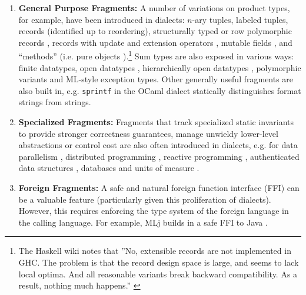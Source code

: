 \documentclass{llncs}
\begin{document}
\begin{enumerate}
\compresslist
\vspace{5px}
\item 
\textbf{General Purpose Fragments:} 
A number of variations on product types, for example, have been introduced in dialects: 
$n$-ary tuples, 
labeled tuples, 
records (identified up to reordering), 
structurally typed or row polymorphic records \cite{Cardelli:1984:SMI:1096.1098}, 
records with update and extension operators \cite{ocaml-manual}, 
mutable fields \cite{ocaml-manual}, 
and 
``methods'' (i.e. pure objects \cite{conf/oopsla/Aldrich13, TSLs}).\footnote{The Haskell wiki notes that ''No, extensible records are not implemented in GHC. The problem is that the record design space is large, and seems to lack local optima. And all reasonable variants break backward compatibility. As a result, nothing much happens.'' \cite{GHCFAQ}} 
 Sum types are also exposed in various ways: 
finite datatypes, 
open datatypes \cite{conf/ppdp/LohH06}, 
hierarchically open datatypes \cite{journals/toplas/MillsteinBC04}, 
polymorphic variants \cite{ocaml-manual} and 
ML-style exception types. Other generally useful fragments are also built in, e.g. \verb|sprintf| in the OCaml dialect statically distinguishes format strings from strings.

\item
\textbf{Specialized Fragments:} Fragments that track specialized static invariants to provide stronger correctness guarantees, manage unwieldy lower-level abstractions or control cost are also often introduced in dialects, e.g. for data parallelism  \cite{chakravarty2007data}, distributed programming \cite{Murphy:2007:TDP:1793574.1793585}, reactive programming \cite{mandel2005reactiveml}, authenticated data structures \cite{Miller:2014:ADS:2535838.2535851}, databases \cite{Ohori:2011:MSM:2034773.2034815} and units of measure \cite{conf/cefp/Kennedy09}.%

\item
\textbf{Foreign Fragments:} A safe and natural foreign function interface (FFI) can be a valuable feature (particularly given this proliferation of dialects). However, this requires enforcing the type system of the foreign language in the calling language. %
For example, MLj builds in a safe FFI to Java \cite{Benton:1999:IWW:317636.317791}.
\end{enumerate}
\vspace{-5px}
\end{document}
